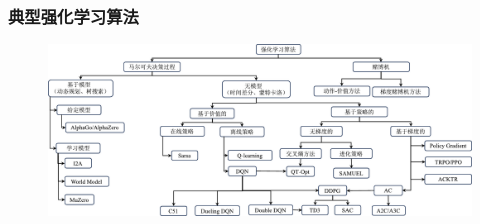 \subsubsection{典型强化学习算法}
\begin{figure}[htbp]
    \centering
    \includegraphics[width = \textwidth]{image/强化学习算法.pdf}
\end{figure}


